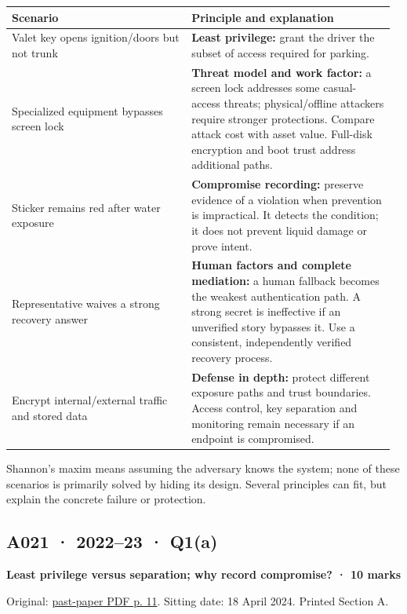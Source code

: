 \documentclass[11pt,a4paper]{article}
\begin{document}
{\small\setlength{\tabcolsep}{3pt}
\begin{longtable}{>{\raggedright\arraybackslash}p{0.45121\linewidth}>{\raggedright\arraybackslash}p{0.51968\linewidth}}
\toprule
\textbf{Scenario} & \textbf{Principle and explanation} \\
\midrule
\endhead
Valet key opens ignition/\allowbreak{}doors but not trunk & \textbf{Least privilege:} grant the driver the subset of access required for parking. \\
Specialized equipment bypasses screen lock & \textbf{Threat model and work factor:} a screen lock addresses some casual-access threats; physical/\allowbreak{}offline attackers require stronger protections. Compare attack cost with asset value. Full-disk encryption and boot trust address additional paths. \\
Sticker remains red after water exposure & \textbf{Compromise recording:} preserve evidence of a violation when prevention is impractical. It detects the condition; it does not prevent liquid damage or prove intent. \\
Representative waives a strong recovery answer & \textbf{Human factors and complete mediation:} a human fallback becomes the weakest authentication path. A strong secret is ineffective if an unverified story bypasses it. Use a consistent,\allowbreak{} independently verified recovery process. \\
Encrypt internal/\allowbreak{}external traffic and stored data & \textbf{Defense in depth:} protect different exposure paths and trust boundaries. Access control,\allowbreak{} key separation and monitoring remain necessary if an endpoint is compromised. \\
\bottomrule
\end{longtable}
}

Shannon's maxim means assuming the adversary knows the system; none of these scenarios is primarily solved by hiding its design. Several principles can fit,\allowbreak{} but explain the concrete failure or protection.




\clearpage
\subsection{A021 · 2022–23 · Q1(a)}\label{a021}

\textbf{Least privilege versus separation; why record compromise? · 10 marks}


Original: \href{../../CSE405-Security_Merged.pdf\#page=11}{past-paper PDF p. 11}. Sitting date: 18 April 2024. Printed Section A.
\end{document}
